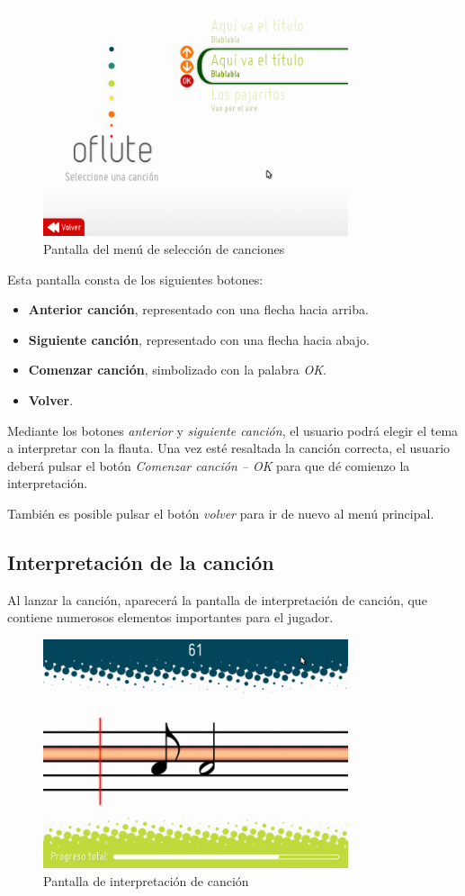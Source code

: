 \begin{figure}[h!]
  \centering
  \includegraphics[width=0.8\textwidth]{apendice_manual_usuario/imagen_seccionCanciones1}
  \caption{Pantalla del menú de selección de canciones}
\end{figure}

Esta pantalla consta de los siguientes botones:
\begin{itemize}
\item \textbf{Anterior canción}, representado con una flecha hacia arriba.
\item \textbf{Siguiente canción}, representado con una flecha hacia abajo.
\item \textbf{Comenzar canción}, simbolizado con la palabra \textit{OK}.
\item \textbf{Volver}.
\end{itemize}

Mediante los botones \textit{anterior} y \textit{siguiente canción}, el usuario
podrá elegir el tema a interpretar con la flauta. Una vez esté resaltada la
canción correcta, el usuario deberá pulsar el botón \textit{Comenzar canción --
  OK} para que dé comienzo la interpretación.

También es posible pulsar el botón \textit{volver} para ir de nuevo al menú
principal.

\subsection{Interpretación de la canción}

Al lanzar la canción, aparecerá la pantalla de interpretación de canción, que
contiene numerosos elementos importantes para el jugador.

\begin{figure}[h!]
  \centering
  \includegraphics[width=0.8\textwidth]{apendice_manual_usuario/imagen_seccionCanciones2}
  \caption{Pantalla de interpretación de canción}
\end{figure}